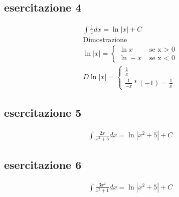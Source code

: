 \subsection{esercitazione 4}
	\begin{equation}
		\begin{matrix}
			\int \frac{1}{x}dx=\ln\left|x\right|+C\\
			\text{Dimostrazione}\\
			\ln\left|x\right|=\begin{cases}
					\ln x & \text{ se x > 0}\\
					\ln -x & \text{ se x < 0}
			\end{cases}\\
			D\ln\left|x\right|=\begin{cases}
				\frac{1}{x}\\
				\frac{1}{-x}*(-1)=\frac{1}{x}
			\end{cases}
		\end{matrix}
	\end{equation}
\subsection{esercitazione 5}
	\begin{equation}
		\begin{matrix}
			\int \frac{2x}{x^2+5}dx=\ln\left|x^2+5\right|+C
		\end{matrix}
	\end{equation}
\subsection{esercitazione 6}
	\begin{equation}
		\begin{matrix}
			\int \frac{3x^2}{x^2+1}dx=\ln\left|x^2+5\right|+C
		\end{matrix}
	\end{equation}

